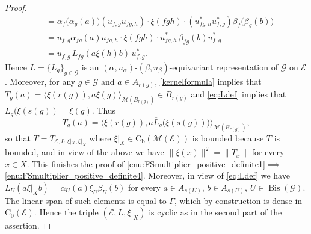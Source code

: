 \documentclass[11 pt, leqno]{amsart}
\numberwithin{equation}{section}
\theoremstyle{plain}
\theoremstyle{definition}
\newcommand*{\contz}{\mathrm{C_0}}%
\newcommand*{\contb}{\mathrm{C_b}}%
\DeclareMathOperator{\Bis}{Bis}
\newcommand{\M}{\mathcal M}
\newcommand{\G}{\mathcal G} %
\newcommand{\EE}{\mathcal E}
\begin{document}
\begin{proof}
\[\begin{split}
        &= \alpha_f\big(\alpha_g(a)\big) (u_{f,g}  u_{fg,h}) \cdot \xi(fgh) \cdot (u_{fg,h}^* u_{f,g}^*) \beta_f\big(\beta_g(b)\big) \\
        &= u_{f,g}\alpha_{fg}(a)u_{fg,h}\cdot \xi(fgh) \cdot u_{fg,h}^*  \, \beta_{fg}(b) u_{f,g}^* \\
        &= u_{f,g} \, L_{fg}(a\xi(h)b) \, u_{f,g}^* . 
\end{split}
\]
Hence $L = \{ L_{g} \}_{g \in \G}$ is an $(\alpha,u_{\alpha})$-$(\beta,u_{\beta})$-equivariant representation of $\G$  on $\EE$.
Moreover, for any $g\in \G$ and $a \in A_{r(g)}$, \eqref{kernelformula} implies that $T_g(a) = \langle \xi(r(g)), a \xi(g) \rangle_{\M(B_{r(g)})}\in B_{r(g)}$ and \eqref{eq:Ldef} implies that $\overline{L}_{g}(\xi(s(g)) = \xi(g)$.
Thus
\[
    T_g(a) = \langle \xi(r(g)), a \overline{L}_g\big(\xi(s(g))\big)\rangle_{\M(B_{r(g)})}, 
\]
so that $T=T_{\EE,L,\xi|_{X},\xi|_{X}}$ where $\xi|_{X} \in \contb(\M(\EE))$ is bounded because $T$ is bounded, and in view of the above we have $\|\xi(x)\|^2=\|T_x\|$ for every $x\in X$. 
This finishes the proof of \ref{enu:FSmultiplier_positive_definite1}$\implies$\ref{enu:FSmultiplier_positive_definite4}. 
Moreover, in view of \eqref{eq:Ldef} we have $L_{U}(a\xi|_{X} b)=\alpha_{U}(a)\xi_{U}\beta_{U}(b)$ for every $a\in A_{s(U)}$, $b\in A_{s(U)}$, $U\in \Bis(\G)$. 
The linear span of such elements is equal to $\Gamma$, which by construction is dense in $\contz(\EE)$. 
Hence the triple $(\EE,L,\xi|_{X})$ is cyclic as in the second part of the assertion.


\end{proof}
\end{document}
